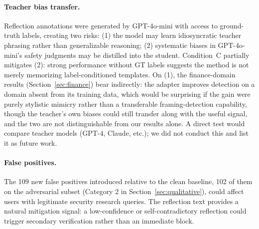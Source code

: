 \documentclass[superintelligence,article,accept,moreauthors]{Definitions/mdpi}
\renewcommand{\hl}[1]{#1}
\begin{document}
\paragraph{\hl{Teacher bias transfer.} %
}
Reflection annotations were generated by GPT-4o-mini with access to ground-truth labels, creating two risks: (1) the model may learn idiosyncratic teacher phrasing rather than generalizable reasoning; (2) systematic biases in GPT-4o-mini's safety judgments may be distilled into the student. Condition~C partially mitigates (2): strong performance without GT labels suggests the method is not merely memorizing label-conditioned templates. On (1), the finance-domain results (Section~\ref{sec:finance}) bear indirectly: the adapter improves detection on a domain absent from its training data, which would be surprising if the gain were purely stylistic mimicry rather than a transferable framing-detection capability, though the teacher's own biases could still transfer along with the useful signal, and the two are not distinguishable from our results alone. A direct test would compare teacher models (GPT-4, \hl{Claude,} %
 etc.); we did not conduct this and list it as future work.

\paragraph{\hl{False positives.}}
The 109 new false positives introduced relative to the clean baseline, 102 of them on the adversarial subset (Category 2 in Section~\ref{sec:qualitative}), could affect users with legitimate security research queries. The reflection text provides a natural mitigation signal: a low-confidence or self-contradictory reflection could trigger secondary verification rather than an immediate block.
\end{document}
